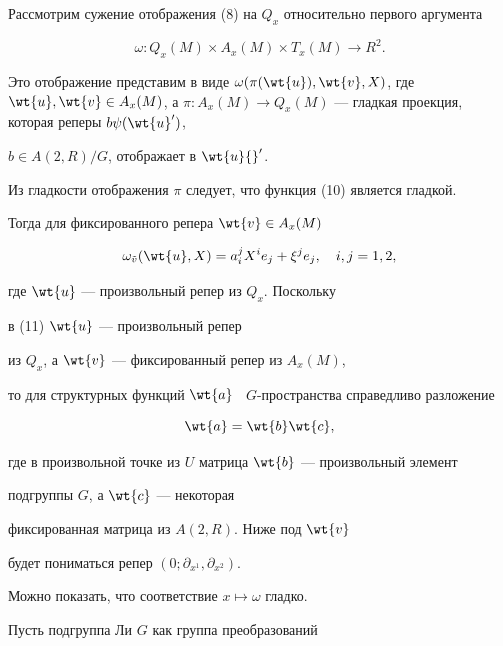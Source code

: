 Рассмотрим сужение отображения (8) на $Q_x$ относительно первого аргумента


\begin{equation}


\omega: Q_x(M)\times A_x(M)\times T_x(M) \to R^2.


\end{equation}


Это отображение представим в виде $\omega(\pi(\wt{u}),


\wt{v},X)$, где $\wt{u},\wt{v} \in A_x(M)$, а $\pi: A_x(M) \to


Q_x(M)$ --- гладкая проекция, которая реперы $b\psi(\wt{u}')$,


$b\in A(2,R)/G$, отображает в $\wt{u}{}'$.


Из гладкости отображения $\pi$ следует, что функция (10) является гладкой.


Тогда для фиксированного репера $\wt{v} \in A_x(M)$


\begin{equation}


\omega_{\Tilde{v}}(\wt{u},X)=a_i^jX^ie_j+\xi^je_j,\quad i,j=1,2,


\end{equation}


где $\wt{u}$ --- произвольный репер из $Q_x$. Поскольку


в (11) $\wt{u}$ --- произвольный репер


из $Q_x$, а $\wt{v}$ --- фиксированный репер из $A_x(M)$,


то для структурных функций $\wt{a}$ \ $G$-пространства справедливо разложение


\begin{equation}


\wt{a}=\wt{b}\wt{c},


\end{equation}


где в произвольной точке из $U$ матрица $\wt{b}$ --- произвольный элемент 


подгруппы $G$, а $\wt{c}$ --- некоторая


фиксированная матрица из $A(2,R)$. Ниже под $\wt{v}$


будет пониматься репер $(0;\partial_{x^1},\partial_{x^2})$.


Можно показать, что соответствие $x \mapsto \omega$ гладко.





Пусть подгруппа Ли $G$ как группа преобразований


